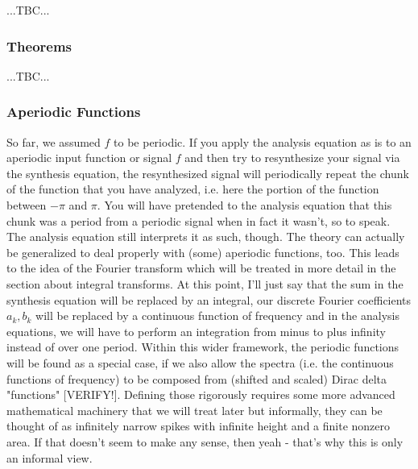 ...TBC...

\subsubsection{Theorems}
...TBC...


\subsubsection{Aperiodic Functions}
So far, we assumed $f$ to be periodic. If you apply the analysis equation as is to an aperiodic input function or signal $f$ and then try to resynthesize your signal via the synthesis equation, the resynthesized signal will periodically repeat the chunk of the function that you have analyzed, i.e. here the portion of the function between $-\pi$ and $\pi$. You will have pretended to the analysis equation that this chunk was a period from a periodic signal when in fact it wasn't, so to speak. The analysis equation still interprets it as such, though. The theory can actually be generalized to deal properly with (some) aperiodic functions, too. This leads to the idea of the Fourier transform which will be treated in more detail in the section about integral transforms. At this point, I'll just say that the sum in the synthesis equation will be replaced by an integral, our discrete Fourier coefficients $a_k, b_k$ will be replaced by a continuous function of frequency and in the analysis equations, we will have to perform an integration from minus to plus infinity instead of over one period. Within this wider framework, the periodic functions will be found as a special case, if we also allow the spectra (i.e. the continuous functions of frequency) to be composed from (shifted and scaled) Dirac delta "functions" [VERIFY!]. Defining those rigorously requires some more advanced mathematical machinery that we will treat later but informally, they can be thought of as infinitely narrow spikes with infinite height and a finite nonzero area. If that doesn't seem to make any sense, then yeah - that's why this is only an informal view.



